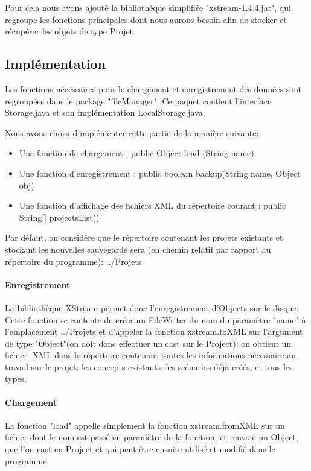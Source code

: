 \documentclass[12pt]{report}
\begin{document}
	Pour cela nous avons ajouté la bibliothèque simplifiée "xstream-1.4.4.jar", qui regroupe les fonctions principales dont nous
aurons besoin afin de stocker et récupérer les objets de type Projet.

\subsection{Implémentation}

	Les fonctions nécessaires pour le chargement et enregistrement des données sont regroupées dans le package "fileManager".
Ce paquet contient l'interface Storage.java et son implémentation LocalStorage.java.

	Nous avons choisi d'implémenter cette partie de la manière suivante:
	\begin{itemize}
	\item Une fonction de chargement : public Object load (String name)
	\item Une fonction d'enregistrement : public boolean backup(String name, Object obj)
	\item Une fonction d'affichage des fichiers XML du répertoire courant : public String[] projectsList()
	\end{itemize}


Par défaut, on considère que le répertoire contenant les projets existants et stockant les nouvelles sauvegarde sera (en chemin relatif par rapport
au répertoire du programme): ../Projets

	\paragraph{Enregistrement}

La bibliothèque XStream permet donc l'enregistrement d'Objects sur le disque. Cette fonction se contente de créer un FileWriter du nom du paramètre "name"
à l'emplacement ../Projets et d'appeler la fonction xstream.toXML sur l'argument de type "Object"(on doit donc effectuer un cast sur le Project): on obtient un fichier .XML dans le répertoire contenant
toutes les informations nécessaire au travail sur le projet: les concepts existants, les scénarios déjà créés, et tous les types.

	\paragraph{Chargement}

La fonction "load" appelle simplement la fonction xstream.fromXML sur un fichier dont le nom est passé en paramètre de la fonction, et renvoie un Object,
que l'on cast en Project et qui peut être ensuite utilisé et modifié dans le programme.
\end{document}
